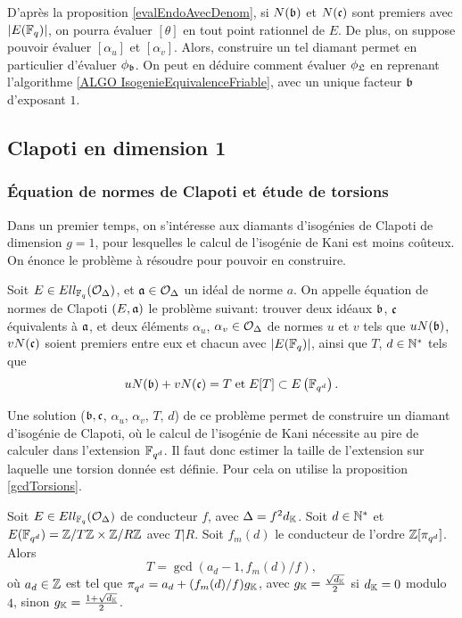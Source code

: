 D'après la proposition \ref{evalEndoAvecDenom}, si $N(\mathfrak{b})$ et $N(\mathfrak{c})$ sont premiers avec $|E(\mathbb{F}_{q})|$, on pourra évaluer $[\theta]$ en tout point rationnel de $E$. De plus, on suppose pouvoir évaluer $[\alpha_u]$ et $[\alpha_v]$. Alors, construire un tel diamant permet en particulier d'évaluer $\phi_{\mathfrak{b}}$. On peut en déduire comment évaluer $\phi_{\mathfrak{L}}$ en reprenant l'algorithme \ref{ALGO IsogenieEquivalenceFriable}, avec un unique facteur $\mathfrak{b}$ d'exposant $1$.   


\subsection{Clapoti en dimension 1}

\subsubsection{Équation de normes de Clapoti et étude de torsions}

Dans un premier temps, on s'intéresse aux diamants d'isogénies de Clapoti de dimension $g = 1$, pour lesquelles le calcul de l'isogénie de Kani est moins coûteux. On énonce le problème à résoudre pour pouvoir en construire. 

\begin{Def}
	Soit $E\in Ell_{\mathbb{F}_{q}}(\mathcal{O}_{\Delta})$, et $\mathfrak{a}\in\mathcal{O}_{\Delta}$ un idéal de norme $a$. On appelle équation de normes de Clapoti $(E,\mathfrak{a})$ le problème suivant: trouver deux idéaux $\mathfrak{b}$, $\mathfrak{c}$ équivalents à $\mathfrak{a}$, et deux éléments $\alpha_u$, $\alpha_v\in\mathcal{O}_{\Delta}$ de normes $u$ et $v$ tels que $uN(\mathfrak{b})$, $vN(\mathfrak{c})$ soient premiers entre eux et chacun avec $|E(\mathbb{F}_{q})|$, ainsi que $T$, $d\in\mathbb{N}^{*}$ tels que
	\begin{equation}\label{equationClapoti}
		uN(\mathfrak{b}) + vN(\mathfrak{c}) = T \;\mbox{et}\; E[T]\subset E\left(\mathbb{F}_{q^{d}}\right).
	\end{equation}
\end{Def}

Une solution ($\mathfrak{b}, \mathfrak{c}$, $\alpha_u$, $\alpha_v$, $T$, $d$) de ce problème permet de construire un diamant d'isogénie de Clapoti, où le calcul de l'isogénie de Kani nécessite au pire de calculer dans l'extension $\mathbb{F}_{q^{d}}$. Il faut donc estimer la taille de l'extension sur laquelle une torsion donnée est définie. Pour cela on utilise la proposition \ref{gcdTorsions}.


\begin{Prop}\label{gcdTorsions}
	Soit $E\in Ell_{\mathbb{F}_{q}}(\mathcal{O}_{\Delta})$ de conducteur $f$, avec $\Delta = f^2d_{\mathbb{K}}$. Soit  $d\in\mathbb{N}^{*}$ et $E(\mathbb{F}_{q^{d}}) = \mathbb{Z}/T\mathbb{Z}\times\mathbb{Z}/R\mathbb{Z}$ avec $T|R$. Soit $f_m(d)$ le conducteur de l'ordre $\mathbb{Z}[\pi_{q^d}]$. Alors
	\begin{equation*}
		T = \gcd(a_d - 1, f_m(d)/f),
	\end{equation*}
	où $a_d\in\mathbb{Z}$ est tel que $\pi_{q^d} = a_d + (f_m(d)/f)g_{\mathbb{K}}$, avec $g_{\mathbb{K}} = \frac{\sqrt{d_{\mathbb{K}}}}{2}$ si $d_{\mathbb{K}} = 0$ modulo $4$, sinon $g_{\mathbb{K}} = \frac{1 + \sqrt{d_{\mathbb{K}}}}{2}$. 
\end{Prop}

